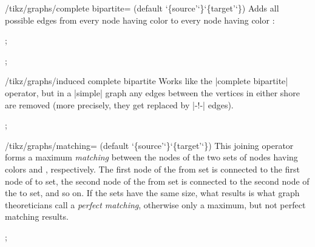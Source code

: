 \begin{key}{/tikz/graphs/complete bipartite= (default \char`\{source'\char`\}\char`\{target'\char`\})}
  Adds all possible edges from every node having color 
  to every node having color : 
\begin{codeexample}[]
\tikz {};    
\end{codeexample}
\begin{codeexample}[]
\tikz {};
\end{codeexample}
\end{key}
\begin{key}{/tikz/graphs/induced complete bipartite}
  Works like the |complete bipartite| operator, but in a |simple|
  graph any edges between the vertices in either shore are removed
  (more precisely, they get replaced by |-!-| edges).
\begin{codeexample}[]
\tikz {};
\end{codeexample}  
\end{key}
\begin{key}{/tikz/graphs/matching= (default \char`\{source'\char`\}\char`\{target'\char`\})}
  This joining operator forms a maximum
  \emph{matching} between the nodes of the two sets of nodes having
  colors  and , respectively. The first node of
  the from set is connected to the first node of to set, the second
  node of the from set is connected to the second node of the to set,
  and so on. If the sets have the same 
  size, what results is what graph theoreticians call a \emph{perfect
    matching}, otherwise only a maximum, but not perfect matching
  results. 
\begin{codeexample}[]
\tikz {};    
\end{codeexample}
\end{key}


